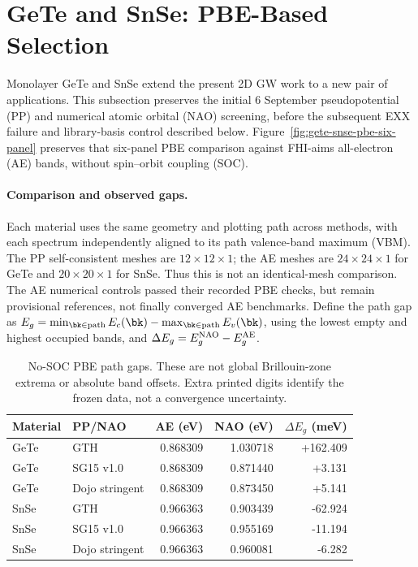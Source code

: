 \clearpage
\section{GeTe and SnSe: PBE-Based Selection}
\label{sec:gete-snse-pbe-selection}

Monolayer GeTe and SnSe extend the present 2D GW work to a new pair of
applications.  This subsection preserves the initial 6 September
pseudopotential (PP) and numerical atomic orbital (NAO) screening, before
the subsequent EXX failure and library-basis control described below.
Figure~\ref{fig:gete-snse-pbe-six-panel}
preserves that six-panel PBE comparison against FHI-aims all-electron
(AE) bands, without spin--orbit coupling (SOC).

\paragraph{Comparison and observed gaps.}
Each material uses the same geometry and plotting path across methods, with
each spectrum independently aligned to its path valence-band maximum (VBM).
The PP self-consistent meshes are \(12\times12\times1\); the AE meshes are
\(24\times24\times1\) for GeTe and \(20\times20\times1\) for SnSe.
Thus this is not an identical-mesh comparison.  The AE numerical controls
passed their recorded PBE checks, but remain provisional references, not
finally converged AE benchmarks.  Define the path gap as
\(E_g=\min_{\bk\in\mathrm{path}}E_c(\bk)
-\max_{\bk\in\mathrm{path}}E_v(\bk)\), using the lowest empty and highest
occupied bands, and \(\Delta E_g=E_g^{\rm NAO}-E_g^{\rm AE}\).

\begin{table}[!ht]
  \centering
  \caption{No-SOC PBE path gaps.  These are not global Brillouin-zone
  extrema or absolute band offsets.  Extra printed digits identify the
  frozen data, not a convergence uncertainty.}
  \label{tab:gete-snse-pbe-gaps}
  \small
  \begin{tabular}{llrrr}
    \toprule
    Material & PP/NAO & AE (eV) & NAO (eV) & \(\Delta E_g\) (meV) \\
    \midrule
    GeTe & GTH            & 0.868309 & 1.030718 & +162.409 \\
    GeTe & SG15 v1.0      & 0.868309 & 0.871440 &   +3.131 \\
    GeTe & Dojo stringent & 0.868309 & 0.873450 &   +5.141 \\
    SnSe & GTH            & 0.966363 & 0.903439 &  -62.924 \\
    SnSe & SG15 v1.0      & 0.966363 & 0.955169 &  -11.194 \\
    SnSe & Dojo stringent & 0.966363 & 0.960081 &   -6.282 \\
    \bottomrule
  \end{tabular}
\end{table}
\FloatBarrier

